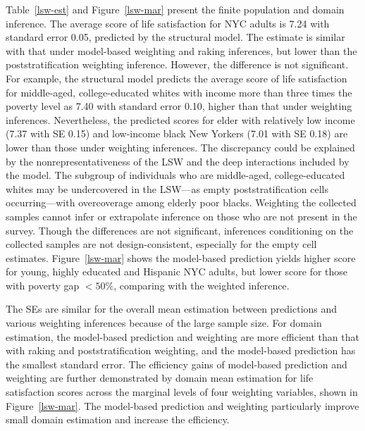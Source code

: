 \documentclass[11pt]{article}
\numberwithin{figure}{section}
\numberwithin{table}{section}
\numberwithin{equation}{section}
\begin{document}
Table~\ref{lsw-est} and Figure~\ref{lsw-mar} present the finite population and
  domain inference. The average score of life satisfaction for NYC adults is
  7.24 with standard error 0.05, predicted by the structural model. The
  estimate is similar with that under model-based weighting and raking
  inferences, but lower than the poststratification weighting inference.
  However, the difference is not significant. For example, the structural model
  predicts the average score of life satisfaction for middle-aged,
  college-educated whites with income more than three times the poverty level
  as 7.40 with standard error 0.10, higher than that under weighting
  inferences. Nevertheless, the predicted scores for elder with relatively low
  income (7.37 with SE 0.15) and low-income black New Yorkers (7.01 with SE
  0.18) are lower than those under weighting inferences.  The discrepancy could
  be explained by the nonrepresentativeness of the LSW and the deep
  interactions included by the model. The subgroup of individuals who are
  middle-aged, college-educated whites may be undercovered in the LSW---as
  empty poststratification cells occurring---with overcoverage among elderly
  poor blacks. Weighting the collected samples cannot infer or extrapolate
  inference on those who are not present in the survey. Though the differences
  are not significant, inferences conditioning on the collected samples are not
  design-consistent, especially for the empty cell estimates.
  Figure~\ref{lsw-mar} shows the model-based prediction yields higher score for
  young, highly educated and Hispanic NYC adults, but lower score for those
  with poverty gap $<50\%$, comparing with the weighted inference.

The SEs are similar for the overall mean estimation between predictions and
  various weighting inferences because of the large sample size. For domain
  estimation, the model-based prediction and weighting are more efficient than
  that with raking and poststratification weighting, and the model-based
  prediction has the smallest standard error. The efficiency gains of
  model-based prediction and weighting are further demonstrated by domain mean
  estimation for life satisfaction scores across the marginal levels of four
  weighting variables, shown in Figure~\ref{lsw-mar}. The model-based
  prediction and weighting particularly improve small domain estimation and
  increase the efficiency. 
\end{document}
